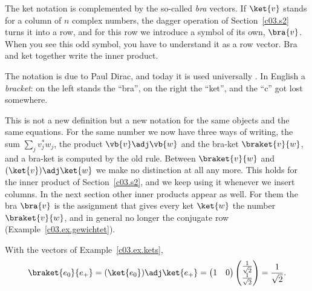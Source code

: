 The ket notation is complemented by the so-called \emph{bra} vectors. If $\ket{v}$ stands for a
column of $n$ complex numbers, the dagger operation of Section~\ref{c03.s2} turns it into a row,
and for this row we introduce a symbol of its own, $\bra{v}$. When you see this odd symbol, you
have to understand it as a row vector. Bra and ket together write the inner product.


\begin{historical}
  The notation is due to Paul Dirac, and today it is used universally
  . In English a \emph{bracket}: on
  the left stands the ``bra'', on the right the ``ket'', and the ``c'' got lost somewhere.
\end{historical}

This is not a new definition but a new notation for the same objects and the same equations.
For the same number we now have three ways of writing, the sum $\sum_{j} v_j^* w_j$, the product
$\vb{v}\adj\vb{w}$ and the bra-ket $\braket{v}{w}$, and a bra-ket is computed by the old rule.
Between $\braket{v}{w}$ and $(\ket{v})\adj \ket{w}$ we make no distinction at all any more. This
holds for the inner product of Section~\ref{c03.s2}, and we keep using it whenever we insert
columns. In the next section other inner products appear as well. For them the bra $\bra{v}$ is
the assignment that gives every ket $\ket{w}$ the number $\braket{v}{w}$, and in general no
longer the conjugate row (Example~\ref{c03.ex.gewichtet}).

\begin{example}\label{c03.ex.braket}
  With the vectors of Example~\ref{c03.ex.kets},
  \begin{equation}\label{c03.eq.e0eplus}
    \braket{e_0}{e_+} = (\ket{e_0})\adj \ket{e_+}
    = \begin{pmatrix} 1 & 0 \end{pmatrix}
      \begin{pmatrix} \frac{1}{\sqrt{2}} \\ \frac{1}{\sqrt{2}} \end{pmatrix}
    = \frac{1}{\sqrt{2}} .
  \end{equation}
\end{example}

